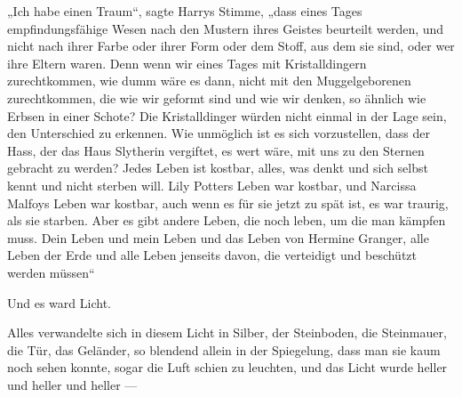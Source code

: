 „Ich habe einen Traum“, sagte Harrys Stimme, „dass eines Tages empfindungsfähige Wesen nach den Mustern ihres Geistes beurteilt werden, und nicht nach ihrer Farbe oder ihrer Form oder dem Stoff, aus dem sie sind, oder wer ihre Eltern waren. Denn wenn wir eines Tages mit Kristalldingern zurechtkommen, wie dumm wäre es dann, nicht mit den Muggelgeborenen zurechtkommen, die wie wir geformt sind und wie wir denken, so ähnlich wie Erbsen in einer Schote? Die Kristalldinger würden nicht einmal in der Lage sein, den Unterschied zu erkennen. Wie unmöglich ist es sich vorzustellen, dass der Hass, der das Haus Slytherin vergiftet, es wert wäre, mit uns zu den Sternen gebracht zu werden? Jedes Leben ist kostbar, alles, was denkt und sich selbst kennt und nicht sterben will. Lily Potters Leben war kostbar, und Narcissa Malfoys Leben war kostbar, auch wenn es für sie jetzt zu spät ist, es war traurig, als sie starben. Aber es gibt andere Leben, die noch leben, um die man kämpfen muss. Dein Leben und mein Leben und das Leben von Hermine Granger, alle Leben der Erde und alle Leben jenseits davon, die verteidigt und beschützt werden müssen“ 

Und es ward Licht.

Alles verwandelte sich in diesem Licht in Silber, der Steinboden, die Steinmauer, die Tür, das Geländer, so blendend allein in der Spiegelung, dass man sie kaum noch sehen konnte, sogar die Luft schien zu leuchten, und das Licht wurde heller und heller und heller —


